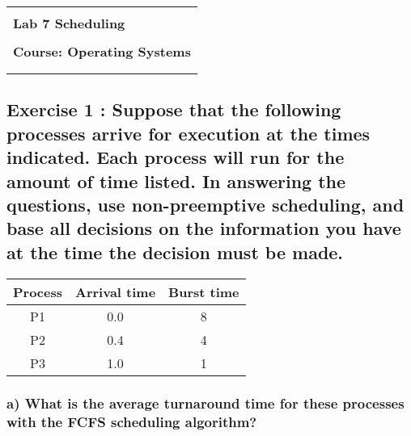 \documentclass[11pt]{article}
\begin{document}
\begin{flushleft}
    \begin{tabular}{c}
        \\ \\ \hline \\
        \multicolumn{1}{l}{\textbf{{\Huge Lab 7 Scheduling}}}		
        \\ \\
        \textbf{{\Huge Course: Operating Systems}}		            
        \\ \\ \hline \\
    \end{tabular}
\end{flushleft}


\vspace{1cm}

\subsection*{Exercise 1 : Suppose that the following 
processes arrive for execution at the times indicated. 
Each process will run for the amount of time listed. In 
answering the questions, use non-preemptive scheduling, 
and base all decisions on the information you have at 
the time the decision must be made.}

\begin{table}[!htp]
    \centering            %
    \def\arraystretch{2}  %
    
    \begin{tabular}{|c||c|c|}
    \hline
    Process & Arrival time & Burst time \\ \hline
    P1      & 0.0          & 8          \\ \hline
    P2      & 0.4          & 4          \\ \hline
    P3      & 1.0          & 1          \\ \hline
    \end{tabular}
\end{table}

\subsubsection*{a) What is the average turnaround time for these 
processes with the FCFS scheduling algorithm?}
\end{document}
